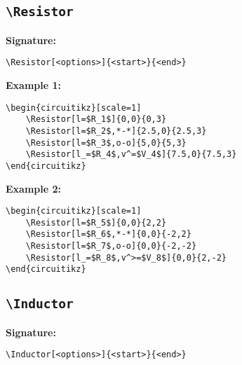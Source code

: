 \documentclass[a4paper,12pt]{article}
\begin{document}
\subsection{\texttt{\textbackslash Resistor}}

\textbf{Signature:}
\begin{verbatim}
\Resistor[<options>]{<start>}{<end>}
\end{verbatim}

\textbf{Example 1:}

\begin{lstlisting}[style=latexstyle]
\begin{circuitikz}[scale=1]
	\Resistor[l=$R_1$]{0,0}{0,3}
	\Resistor[l=$R_2$,*-*]{2.5,0}{2.5,3}
	\Resistor[l=$R_3$,o-o]{5,0}{5,3}
	\Resistor[l_=$R_4$,v^=$V_4$]{7.5,0}{7.5,3}
\end{circuitikz}
\end{lstlisting}


\begin{center}
\begin{circuitikz}[scale=1]
\end{circuitikz}
\end{center}

\textbf{Example 2:}

\begin{lstlisting}[style=latexstyle]
\begin{circuitikz}[scale=1]
	\Resistor[l=$R_5$]{0,0}{2,2}
	\Resistor[l=$R_6$,*-*]{0,0}{-2,2}
	\Resistor[l=$R_7$,o-o]{0,0}{-2,-2}
	\Resistor[l_=$R_8$,v^>=$V_8$]{0,0}{2,-2}
\end{circuitikz}
\end{lstlisting}

\begin{center}
\begin{circuitikz}[scale=1]
\end{circuitikz}
\end{center}

\subsection{\texttt{\textbackslash Inductor}}

\textbf{Signature:}
\begin{verbatim}
\Inductor[<options>]{<start>}{<end>}
\end{verbatim}
\end{document}
